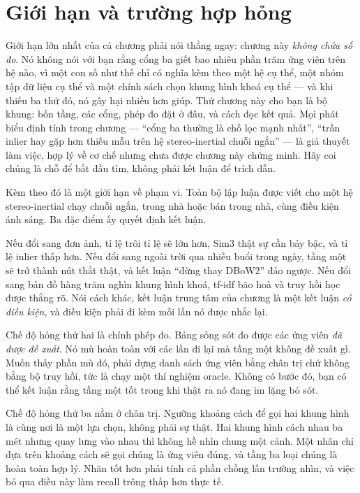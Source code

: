 \documentclass[../../deep_learning.tex]{subfiles}
\begin{document}
\section{Giới hạn và trường hợp hỏng}
Giới hạn lớn nhất của cả chương phải nói thẳng ngay: chương này \emph{không chứa số đo}. Nó không nói với bạn rằng cổng ba giết bao nhiêu phần trăm ứng viên trên hệ nào, vì một con số như thế chỉ có nghĩa kèm theo một hệ cụ thể, một nhóm tập dữ liệu cụ thể và một chính sách chọn khung hình khoá cụ thể --- và khi thiếu ba thứ đó, nó gây hại nhiều hơn giúp. Thứ chương này cho bạn là bộ khung: bốn tầng, các cổng, phép đo đặt ở đâu, và cách đọc kết quả. Mọi phát biểu định tính trong chương --- ``cổng ba thường là chỗ lọc mạnh nhất'', ``trần inlier hay gặp hơn thiếu mẫu trên hệ stereo-inertial chuỗi ngắn'' --- là giả thuyết làm việc, hợp lý về cơ chế nhưng chưa được chương này chứng minh. Hãy coi chúng là chỗ để bắt đầu tìm, không phải kết luận để trích dẫn.

Kèm theo đó là một giới hạn về phạm vi. Toàn bộ lập luận được viết cho một hệ stereo-inertial chạy chuỗi ngắn, trong nhà hoặc bán trong nhà, cùng điều kiện ánh sáng. Ba đặc điểm ấy quyết định kết luận.

Nếu đổi sang đơn ảnh, tỉ lệ trôi tỉ lệ sẽ lớn hơn, Sim3 thật sự cần bảy bậc, và tỉ lệ inlier thấp hơn. Nếu đổi sang ngoài trời qua nhiều buổi trong ngày, tầng một sẽ trở thành nút thắt thật, và kết luận ``đừng thay DBoW2'' đảo ngược. Nếu đổi sang bản đồ hàng trăm nghìn khung hình khoá, tf-idf bão hoà và truy hồi học được thắng rõ. Nói cách khác, kết luận trung tâm của chương là một kết luận \emph{có điều kiện}, và điều kiện phải đi kèm mỗi lần nó được nhắc lại.

Chế độ hỏng thứ hai là chính phép đo. Bảng sống sót đo được các ứng viên \emph{đã được đề xuất}. Nó mù hoàn toàn với các lần đi lại mà tầng một không đề xuất gì. Muốn thấy phần mù đó, phải dựng danh sách ứng viên bằng chân trị chứ không bằng bộ truy hồi, tức là chạy một thí nghiệm oracle. Không có bước đó, bạn có thể kết luận rằng tầng một tốt trong khi thật ra nó đang im lặng bỏ sót.

Chế độ hỏng thứ ba nằm ở chân trị. Ngưỡng khoảng cách để gọi hai khung hình là cùng nơi là một lựa chọn, không phải sự thật. Hai khung hình cách nhau ba mét nhưng quay lưng vào nhau thì không hề nhìn chung một cảnh. Một nhãn chỉ dựa trên khoảng cách sẽ gọi chúng là ứng viên đúng, và tầng ba loại chúng là hoàn toàn hợp lý. Nhãn tốt hơn phải tính cả phần chồng lấn trường nhìn, và việc bỏ qua điều này làm recall trông thấp hơn thực tế.
\end{document}
